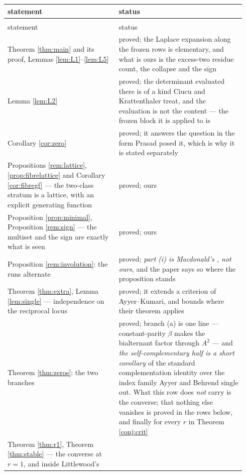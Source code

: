 \documentclass[11pt,reqno]{amsart}
\newcommand{\stproved}{\textcolor{hproved}{\small proved}}
\theoremstyle{plain}
\theoremstyle{definition}
\begin{document}
\begingroup{}\footnotesize\setlength{\tabcolsep}{4.0pt}
\begin{longtable}{@{}>{\raggedright\arraybackslash}p{0.44\linewidth}%
                   >{\raggedright\arraybackslash}p{0.50\linewidth}@{}}
\toprule
statement & status\\
\midrule
\endfirsthead
\multicolumn{2}{@{}l}{\footnotesize\itshape What is ours, continued}\\[1pt]
\toprule
statement & status\\
\midrule
\endhead
Theorem \ref{thm:main} and its proof, Lemmas \ref{lem:L1}--\ref{lem:L5} & \stproved; the Laplace
expansion along the frozen rows is elementary, and what is ours is the excess-two residue count, the
collapse and the sign\\
Lemma \ref{lem:L2} & \stproved; the determinant evaluated there is of a kind Ciucu and Krattenthaler
treat, and the evaluation is not the content --- the frozen block it is applied to is\\
Corollary \ref{cor:zero} & \stproved; it answers the question in the form Prasad posed it, which is
why it is stated separately\\
Propositions \ref{rem:lattice}, \ref{prop:fibrelattice} and Corollary \ref{cor:fibregf} --- the
two-class stratum is a lattice, with an explicit generating function & \stproved; ours\\
Proposition \ref{prop:minimal}, Proposition \ref{rem:sign} --- the multiset and the sign are exactly
what is seen & \stproved; ours\\
Proposition \ref{rem:involution}: the runs alternate & \stproved; \emph{part (i) is Macdonald's \cite[p.~91]{Mac95}, not
ours}, and the paper says so where the proposition stands\\
Theorem \ref{thm:extra}, Lemma \ref{lem:single} --- independence on the reciprocal locus &
\stproved; it extends a criterion of Ayyer--Kumari, and bounds where their theorem applies\\
Theorem \ref{thm:zeros}: the two branches & \stproved; branch (a) is one line --- constant-parity
$\beta$ makes the bialternant factor through $A^2$ --- and \emph{the self-complementary half is a
short corollary} of the standard complementation identity over the index family Ayyer and Behrend
single out. What this row does \emph{not} carry is the converse; that nothing else vanishes is proved in the
rows below, and finally for every $r$ in Theorem \ref{conj:crit}\\
Theorem \ref{thm:r1}, Theorem \ref{thm:stable} --- the converse at $r=1$, and inside Littlewood's

\end{longtable}
\end{document}
